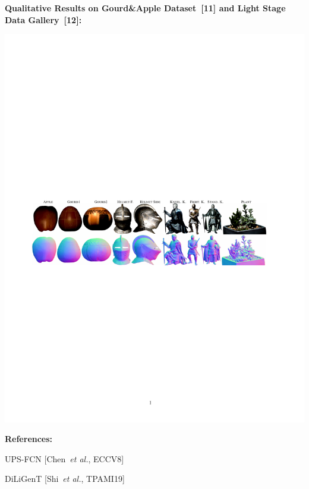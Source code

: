 \documentclass[landscape,a0paper,fontscale=0.292]{baposter}
\begin{document}
\begin{poster}
{    \vspace{-0.8em}
    \begin{minipage}[t]{0.72\textwidth}
        \textbf{\color{blue}Qualitative Results on Gourd\&Apple Dataset~[11] and Light Stage Data Gallery~[12]:} \\
        \vspace{-1.5em}
        \begin{center}
            \includegraphics[width=\textwidth]{images/qual_others.pdf}
        \end{center}
    \end{minipage}
    \begin{minipage}[t]{0.28\textwidth}
    \textbf{\color{blue}References:} \\
        \vspace{-1.0em}
        \begin{enumerate}[label={[\arabic*]}]
            \footnotesize
            \item UPS-FCN [Chen~\emph{et al.}, ECCV8]
            \item DiLiGenT [Shi~\emph{et al.}, TPAMI19]

\end{enumerate}
\end{minipage}}
\end{poster}
\end{document}
